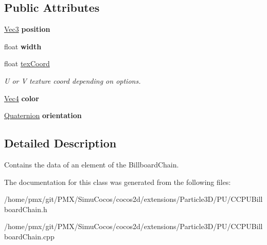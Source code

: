 \subsection*{Public Attributes}
\begin{DoxyCompactItemize}
\item 
\mbox{\label{classPUBillboardChain_1_1Element_a734cb3ecd1ae3e55bed2f88761a6b75f}} 
\hyperlink{classVec3}{Vec3} {\bfseries position}
\item 
\mbox{\label{classPUBillboardChain_1_1Element_aacb6b3b4a46ff53e315ebcbc5dc42faf}} 
float {\bfseries width}
\item 
\mbox{\label{classPUBillboardChain_1_1Element_a08c1434697d6cefc5e8b62017c52a0b2}} 
float \hyperlink{classPUBillboardChain_1_1Element_a08c1434697d6cefc5e8b62017c52a0b2}{tex\+Coord}
\begin{DoxyCompactList}\small\item\em U or V texture coord depending on options. \end{DoxyCompactList}\item 
\mbox{\label{classPUBillboardChain_1_1Element_a3ee77fbded59e87c58acfb423fe1fc7b}} 
\hyperlink{classVec4}{Vec4} {\bfseries color}
\item 
\mbox{\label{classPUBillboardChain_1_1Element_abdca5644f98f44391752ead678efa4f5}} 
\hyperlink{classQuaternion}{Quaternion} {\bfseries orientation}
\end{DoxyCompactItemize}


\subsection{Detailed Description}
Contains the data of an element of the Billboard\+Chain. 

The documentation for this class was generated from the following files\+:\begin{DoxyCompactItemize}
\item 
/home/pmx/git/\+P\+M\+X/\+Simu\+Cocos/cocos2d/extensions/\+Particle3\+D/\+P\+U/C\+C\+P\+U\+Billboard\+Chain.\+h\item 
/home/pmx/git/\+P\+M\+X/\+Simu\+Cocos/cocos2d/extensions/\+Particle3\+D/\+P\+U/C\+C\+P\+U\+Billboard\+Chain.\+cpp\end{DoxyCompactItemize}
